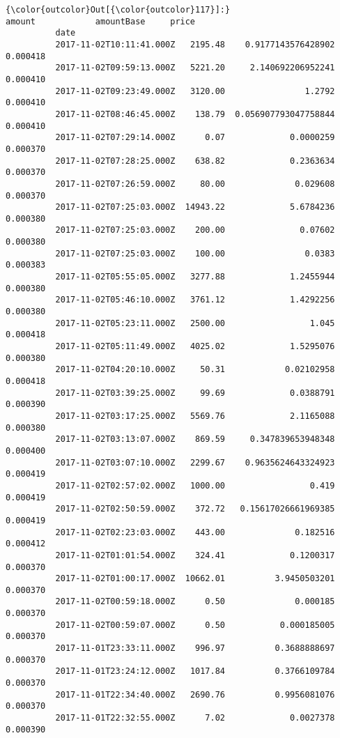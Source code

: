 \documentclass[11pt]{article}
\begin{document}
\begin{Verbatim}[commandchars=\\\{\}]
{\color{outcolor}Out[{\color{outcolor}117}]:}                             amount            amountBase     price
          date                                                              
          2017-11-02T10:11:41.000Z   2195.48    0.9177143576428902  0.000418
          2017-11-02T09:59:13.000Z   5221.20     2.140692206952241  0.000410
          2017-11-02T09:23:49.000Z   3120.00                1.2792  0.000410
          2017-11-02T08:46:45.000Z    138.79  0.056907793047758844  0.000410
          2017-11-02T07:29:14.000Z      0.07             0.0000259  0.000370
          2017-11-02T07:28:25.000Z    638.82             0.2363634  0.000370
          2017-11-02T07:26:59.000Z     80.00              0.029608  0.000370
          2017-11-02T07:25:03.000Z  14943.22             5.6784236  0.000380
          2017-11-02T07:25:03.000Z    200.00               0.07602  0.000380
          2017-11-02T07:25:03.000Z    100.00                0.0383  0.000383
          2017-11-02T05:55:05.000Z   3277.88             1.2455944  0.000380
          2017-11-02T05:46:10.000Z   3761.12             1.4292256  0.000380
          2017-11-02T05:23:11.000Z   2500.00                 1.045  0.000418
          2017-11-02T05:11:49.000Z   4025.02             1.5295076  0.000380
          2017-11-02T04:20:10.000Z     50.31            0.02102958  0.000418
          2017-11-02T03:39:25.000Z     99.69             0.0388791  0.000390
          2017-11-02T03:17:25.000Z   5569.76             2.1165088  0.000380
          2017-11-02T03:13:07.000Z    869.59     0.347839653948348  0.000400
          2017-11-02T03:07:10.000Z   2299.67    0.9635624643324923  0.000419
          2017-11-02T02:57:02.000Z   1000.00                 0.419  0.000419
          2017-11-02T02:50:59.000Z    372.72   0.15617026661969385  0.000419
          2017-11-02T02:23:03.000Z    443.00              0.182516  0.000412
          2017-11-02T01:01:54.000Z    324.41             0.1200317  0.000370
          2017-11-02T01:00:17.000Z  10662.01          3.9450503201  0.000370
          2017-11-02T00:59:18.000Z      0.50              0.000185  0.000370
          2017-11-02T00:59:07.000Z      0.50           0.000185005  0.000370
          2017-11-01T23:33:11.000Z    996.97          0.3688888697  0.000370
          2017-11-01T23:24:12.000Z   1017.84          0.3766109784  0.000370
          2017-11-01T22:34:40.000Z   2690.76          0.9956081076  0.000370
          2017-11-01T22:32:55.000Z      7.02             0.0027378  0.000390

\end{Verbatim}
\end{document}
